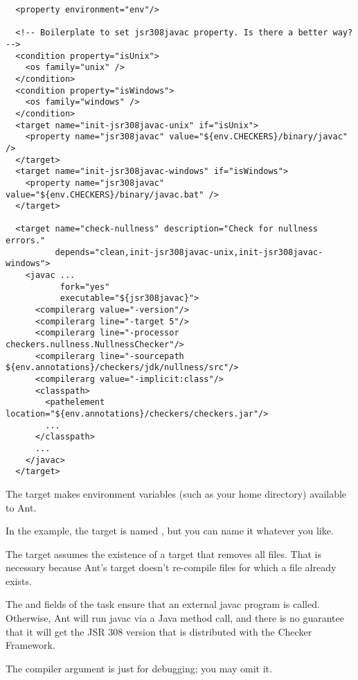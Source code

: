 \begin{smaller}
\begin{Verbatim}
  <property environment="env"/>

  <!-- Boilerplate to set jsr308javac property. Is there a better way? -->
  <condition property="isUnix">
    <os family="unix" />
  </condition>
  <condition property="isWindows">
    <os family="windows" />
  </condition>
  <target name="init-jsr308javac-unix" if="isUnix">
    <property name="jsr308javac" value="${env.CHECKERS}/binary/javac" />
  </target>
  <target name="init-jsr308javac-windows" if="isWindows">
    <property name="jsr308javac" value="${env.CHECKERS}/binary/javac.bat" />
  </target>

  <target name="check-nullness" description="Check for nullness errors."
          depends="clean,init-jsr308javac-unix,init-jsr308javac-windows">
    <javac ...
           fork="yes"
           executable="${jsr308javac}">
      <compilerarg value="-version"/>
      <compilerarg line="-target 5"/>
      <compilerarg line="-processor checkers.nullness.NullnessChecker"/>
      <compilerarg line="-sourcepath ${env.annotations}/checkers/jdk/nullness/src"/>
      <compilerarg value="-implicit:class"/>
      <classpath>
        <pathelement location="${env.annotations}/checkers/checkers.jar"/>
        ...
      </classpath>
      ...
    </javac>
  </target>
\end{Verbatim}
\end{smaller}

The  target makes environment variables (such as your home
directory) available to Ant.

In the example, the target is named , but you can
name it whatever you like.

The target assumes the existence of a  target that removes all
 files.  That is necessary because Ant's  target
doesn't re-compile  files for which a  file
already exists.

The  and  fields of the  task
ensure that an external javac program is called.  Otherwise, Ant will run
javac via a Java method call, and there is no guarantee that it will get
the JSR 308 version that is distributed with the Checker Framework.

The  compiler argument is just for debugging; you may omit
it.


